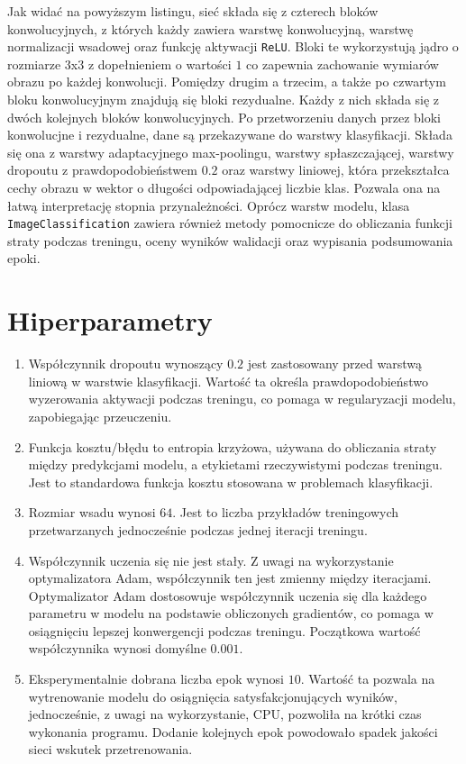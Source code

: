 \documentclass[11pt]{article}
\begin{document}
	Jak widać na powyższym listingu, sieć składa się z czterech bloków konwolucyjnych, z których każdy zawiera warstwę konwolucyjną, warstwę normalizacji
	wsadowej oraz funkcję aktywacji \texttt{ReLU}. Bloki te wykorzystują jądro o rozmiarze $3$x$3$ z dopełnieniem o wartości $1$
	co zapewnia zachowanie wymiarów obrazu po każdej konwolucji. Pomiędzy drugim a trzecim, a także po czwartym bloku konwolucyjnym znajdują się bloki rezydualne. Każdy
	z nich składa się z dwóch kolejnych bloków konwolucyjnych. Po przetworzeniu danych przez bloki konwolucjne i rezydualne, dane są przekazywane do warstwy klasyfikacji.
	Składa się ona z warstwy adaptacyjnego max-poolingu, warstwy spłaszczającej, warstwy dropoutu z prawdopodobieństwem $0.2$
	oraz warstwy liniowej, która przekształca cechy obrazu w wektor o długości odpowiadającej liczbie klas. Pozwala ona na łatwą interpretację stopnia przynależności.
	Oprócz warstw modelu, klasa \texttt{ImageClassification} zawiera również metody pomocnicze do obliczania funkcji straty podczas treningu,
	oceny wyników walidacji oraz wypisania podsumowania epoki.

	\section{Hiperparametry}
	\begin{enumerate}
		\item Współczynnik dropoutu wynoszący $0.2$ jest zastosowany przed warstwą liniową w warstwie klasyfikacji.
			Wartość ta określa prawdopodobieństwo wyzerowania aktywacji podczas treningu, co pomaga w regularyzacji modelu, zapobiegając przeuczeniu.
		\item Funkcja kosztu/błędu to entropia krzyżowa, używana do obliczania straty między predykcjami modelu, a etykietami
			rzeczywistymi podczas treningu. Jest to standardowa funkcja kosztu stosowana w problemach klasyfikacji.
		\item Rozmiar wsadu wynosi $64$. Jest to liczba przykładów treningowych przetwarzanych jednocześnie podczas jednej iteracji treningu.
		\item Współczynnik uczenia się nie jest stały. Z uwagi na wykorzystanie optymalizatora Adam, współczynnik ten jest zmienny między iteracjami. 
			Optymalizator Adam dostosowuje współczynnik uczenia się dla każdego parametru w modelu na podstawie obliczonych gradientów, co pomaga w osiągnięciu lepszej konwergencji podczas treningu.
			Początkowa wartość współczynnika wynosi domyślne $0.001$.
		\item Eksperymentalnie dobrana liczba epok wynosi $10$. Wartość ta pozwala na wytrenowanie modelu do osiągnięcia satysfakcjonujących wyników, jednocześnie, z uwagi na wykorzystanie, CPU, pozwoliła na 
			krótki czas wykonania programu. Dodanie kolejnych epok powodowało spadek jakości sieci wskutek przetrenowania.
	\end{enumerate}
\end{document}
